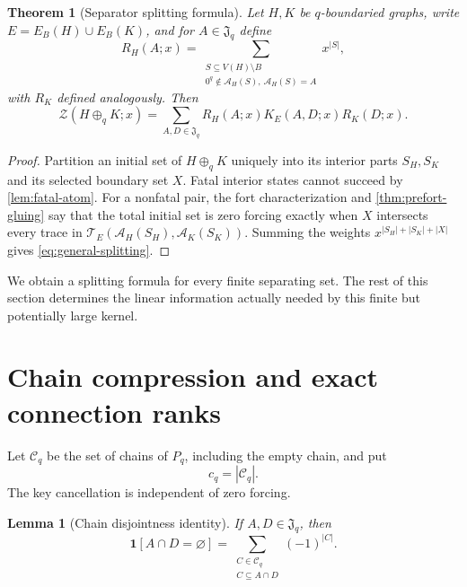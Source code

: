 \documentclass[11pt,reqno]{amsart}
\newtheorem{theorem}{Theorem}[section]
\newtheorem{lemma}[lemma]{Lemma}
\theoremstyle{definition}
\newcommand{\Zpoly}{\mathcal Z}
\begin{document}
\begin{theorem}[Separator splitting formula]\label{thm:separator-splitting}
Let $H,K$ be $q$-boundaried graphs, write
$E=E_B(H)\cup E_B(K)$, and for $A\in\mathfrak J_q$ define
\[
 R_H(A;x)=
 \sum_{\substack{S\subseteq V(H)\setminus B\\
       0^q\notin\mathcal A_H(S),\ \mathcal A_H(S)=A}}x^{|S|},
\]
with $R_K$ defined analogously.  Then
\begin{equation}\label{eq:general-splitting}
 \boxed{
 \Zpoly(H\oplus_qK;x)
 =\sum_{A,D\in\mathfrak J_q}
   R_H(A;x)K_E(A,D;x)R_K(D;x).
 }
\end{equation}
\end{theorem}

\begin{proof}
Partition an initial set of $H\oplus_qK$ uniquely into its interior parts
$S_H,S_K$ and its selected boundary set $X$.  Fatal interior states cannot
succeed by \cref{lem:fatal-atom}.  For a nonfatal pair, the fort
characterization and \cref{thm:prefort-gluing} say that the total initial set
is zero forcing exactly when $X$ intersects every trace in
$\mathcal T_E(\mathcal A_H(S_H),\mathcal A_K(S_K))$.  Summing the weights
$x^{|S_H|+|S_K|+|X|}$ gives \eqref{eq:general-splitting}.
\end{proof}

We obtain a splitting formula for every finite separating set.  The rest of
this section determines the linear information actually needed by this finite
but potentially large kernel.

\section{Chain compression and exact connection ranks}\label{sec:separator-rank}

Let $\mathcal C_q$ be the set of chains of $P_q$, including the empty chain,
and put
\[
  c_q=|\mathcal C_q|.
\]
The key cancellation is independent of zero forcing.

\begin{lemma}[Chain disjointness identity]\label{lem:chain-disjointness}
If $A,D\in\mathfrak J_q$, then
\begin{equation}\label{eq:chain-disjointness}
 \mathbf1[A\cap D=\varnothing]
 =\sum_{\substack{C\in\mathcal C_q\\C\subseteq A\cap D}}(-1)^{|C|}.
\end{equation}
\end{lemma}
\end{document}
